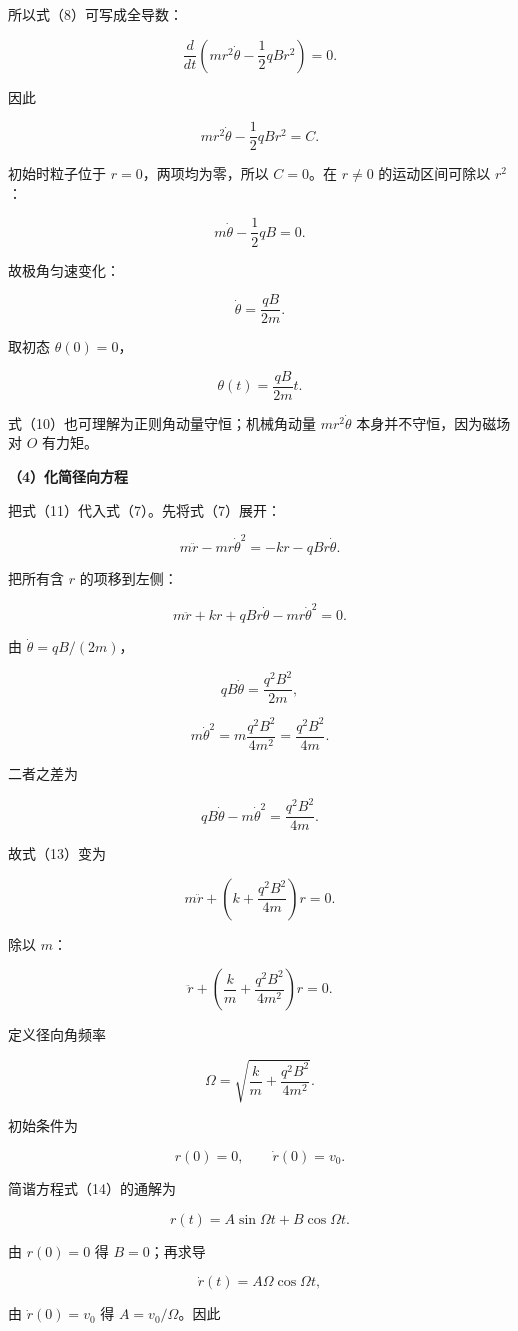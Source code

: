 \documentclass[12pt,a4paper,UTF8]{ctexart}
\begin{document}
所以式（8）可写成全导数：

\[\frac{d}{dt}\left(mr^2\dot\theta-\frac12qBr^2\right)=0.\]

因此

\[mr^2\dot\theta-\frac12qBr^2=C.\]

初始时粒子位于 \(r=0\)，两项均为零，所以 \(C=0\)。在 \(r\neq0\)
的运动区间可除以 \(r^2\)：

\[m\dot\theta-\frac12qB=0.\]

故极角匀速变化：

\[\boxed{\dot\theta=\frac{qB}{2m}}.\]

取初态 \(\theta(0)=0\)，

\[\boxed{\theta(t)=\frac{qB}{2m}t}.\]

式（10）也可理解为正则角动量守恒；机械角动量 \(mr^2\dot\theta\)
本身并不守恒，因为磁场对 \(O\) 有力矩。

\textbf{（4）化简径向方程}

把式（11）代入式（7）。先将式（7）展开：

\[m\ddot r-mr\dot\theta^2=-kr-qBr\dot\theta.\]

把所有含 \(r\) 的项移到左侧：

\[m\ddot r+kr+qBr\dot\theta-mr\dot\theta^2=0.\]

由 \(\dot\theta=qB/(2m)\)，

\[qB\dot\theta=\frac{q^2B^2}{2m},\]

\[m\dot\theta^2=m\frac{q^2B^2}{4m^2}=\frac{q^2B^2}{4m}.\]

二者之差为

\[qB\dot\theta-m\dot\theta^2=\frac{q^2B^2}{4m}.\]

故式（13）变为

\[m\ddot r+\left(k+\frac{q^2B^2}{4m}\right)r=0.\]

除以 \(m\)：

\[\ddot r+\left(\frac km+\frac{q^2B^2}{4m^2}\right)r=0.\]

定义径向角频率

\[\Omega=\sqrt{\frac km+\frac{q^2B^2}{4m^2}}.\]

初始条件为

\[r(0)=0,\qquad \dot r(0)=v_0.\]

简谐方程式（14）的通解为

\[r(t)=A\sin\Omega t+B\cos\Omega t.\]

由 \(r(0)=0\) 得 \(B=0\)；再求导

\[\dot r(t)=A\Omega\cos\Omega t,\]

由 \(\dot r(0)=v_0\) 得 \(A=v_0/\Omega\)。因此
\end{document}
